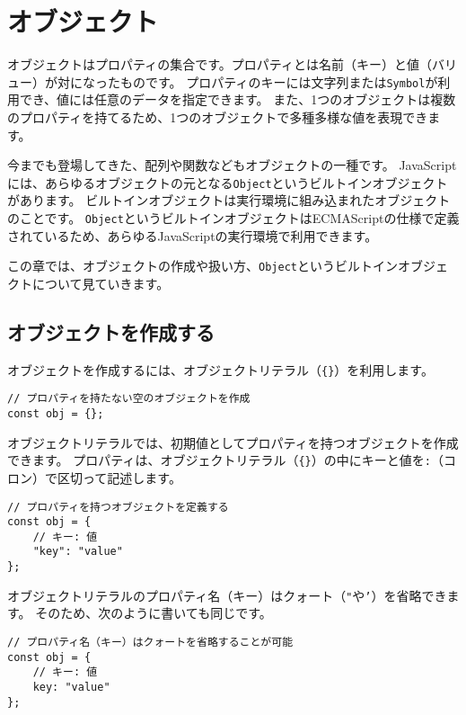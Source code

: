 \hypertarget{object}{%
\chapter{オブジェクト}\label{object}}

オブジェクトはプロパティの集合です。プロパティとは名前（キー）と値（バリュー）が対になったものです。
プロパティのキーには文字列または\texttt{Symbol}が利用でき、値には任意のデータを指定できます。
また、1つのオブジェクトは複数のプロパティを持てるため、1つのオブジェクトで多種多様な値を表現できます。

今までも登場してきた、配列や関数などもオブジェクトの一種です。
JavaScriptには、あらゆるオブジェクトの元となる\texttt{Object}というビルトインオブジェクトがあります。
ビルトインオブジェクトは実行環境に組み込まれたオブジェクトのことです。
\texttt{Object}というビルトインオブジェクトはECMAScriptの仕様で定義されているため、あらゆるJavaScriptの実行環境で利用できます。

この章では、オブジェクトの作成や扱い方、\texttt{Object}というビルトインオブジェクトについて見ていきます。

\hypertarget{create-object}{%
\section{オブジェクトを作成する}\label{create-object}}

オブジェクトを作成するには、オブジェクトリテラル（\texttt{\{\}}）を利用します。

\begin{lstlisting}
// プロパティを持たない空のオブジェクトを作成
const obj = {};
\end{lstlisting}

オブジェクトリテラルでは、初期値としてプロパティを持つオブジェクトを作成できます。
プロパティは、オブジェクトリテラル（\texttt{\{\}}）の中にキーと値を\texttt{:}（コロン）で区切って記述します。

\begin{lstlisting}
// プロパティを持つオブジェクトを定義する
const obj = {
    // キー: 値
    "key": "value"
};
\end{lstlisting}

オブジェクトリテラルのプロパティ名（キー）はクォート（\texttt{"}や\texttt{'}）を省略できます。
そのため、次のように書いても同じです。

\begin{lstlisting}
// プロパティ名（キー）はクォートを省略することが可能
const obj = {
    // キー: 値
    key: "value"
};
\end{lstlisting}

